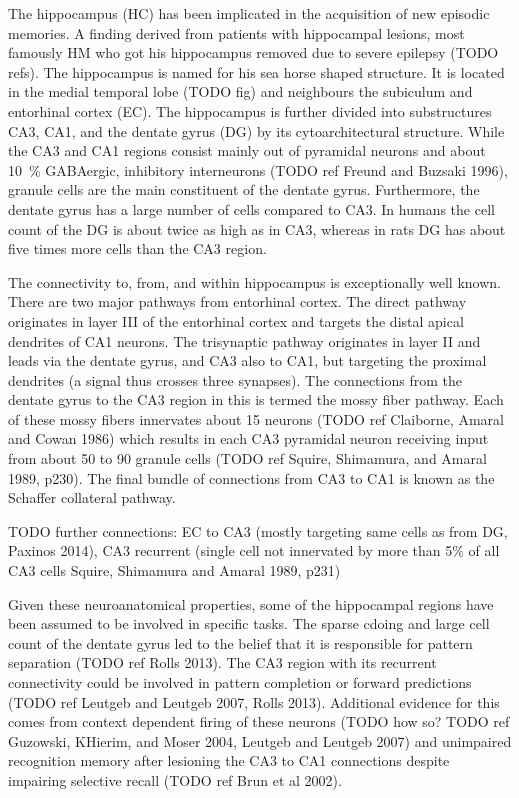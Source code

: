 The hippocampus (HC) has been implicated in the acquisition of new episodic memories.
A finding derived from patients with hippocampal lesions, most famously HM who got his hippocampus removed due to severe epilepsy (TODO refs).
The hippocampus is named for his sea horse shaped structure.
It is located in the medial temporal lobe (TODO fig) and neighbours the subiculum and entorhinal cortex (EC).
The hippocampus is further divided into substructures CA3, CA1, and the dentate gyrus (DG) by its cytoarchitectural structure.
While the CA3 and CA1 regions consist mainly out of pyramidal neurons and about \SI{10}{\percent} GABAergic, inhibitory interneurons (TODO ref Freund and Buzsaki 1996), granule cells are the main constituent of the dentate gyrus.
Furthermore, the dentate gyrus has a large number of cells compared to CA3.
In humans the cell count of the DG is about twice as high as in CA3, whereas in rats DG has about five times more cells than the CA3 region.

The connectivity to, from, and within hippocampus is exceptionally well known.
There are two major pathways from entorhinal cortex.
The direct pathway originates in layer III of the entorhinal cortex and targets the distal apical dendrites of CA1 neurons.
The trisynaptic pathway originates in layer II and leads via the dentate gyrus, and CA3 also to CA1, but targeting the proximal dendrites (a signal thus crosses three synapses).
The connections from the dentate gyrus to the CA3 region in this is termed the mossy fiber pathway.
Each of these mossy fibers innervates about 15 neurons (TODO ref Claiborne, Amaral and Cowan 1986) which results in each CA3 pyramidal neuron receiving input from about 50 to 90 granule cells (TODO ref Squire, Shimamura, and Amaral 1989, p230).
The final bundle of connections from CA3 to CA1 is known as the Schaffer collateral pathway.

TODO further connections: EC to CA3 (mostly targeting same cells as from DG, Paxinos 2014), CA3 recurrent (single cell not innervated by more than 5\% of all CA3 cells Squire, Shimamura and Amaral 1989, p231)

Given these neuroanatomical properties, some of the hippocampal regions have been assumed to be involved in specific tasks.
The sparse cdoing and large cell count of the dentate gyrus led to the belief that it is responsible for pattern separation (TODO ref Rolls 2013).
The CA3 region with its recurrent connectivity could be involved in pattern completion or forward predictions (TODO ref Leutgeb and Leutgeb 2007, Rolls 2013).
Additional evidence for this comes from context dependent firing of these neurons (TODO how so? TODO ref Guzowski, KHierim, and Moser 2004, Leutgeb and Leutgeb 2007) and unimpaired recognition memory after lesioning the CA3 to CA1 connections despite impairing selective recall (TODO ref Brun et al 2002). 

